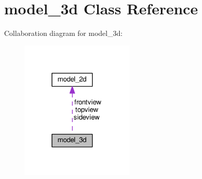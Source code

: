 \hypertarget{classmodel__3d}{}\section{model\+\_\+3d Class Reference}
\label{classmodel__3d}


Collaboration diagram for model\+\_\+3d\+:
\nopagebreak
\begin{figure}[H]
\begin{center}
\leavevmode
\includegraphics[width=153pt]{classmodel__3d__coll__graph}
\end{center}
\end{figure}
